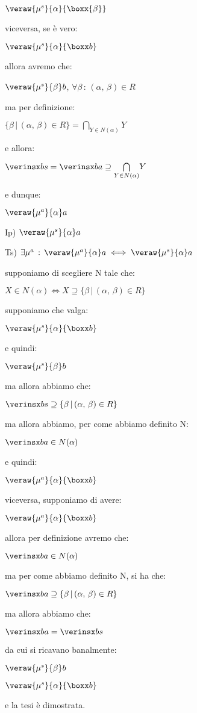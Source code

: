 $\veraw{\mu^{s}}{\alpha}{\boxx{\beta}}$

viceversa, se è vero:

$\veraw{\mu^{s}}{\alpha}{\boxx b}$

allora avremo che:

$\veraw{\mu^{s}}{\beta}b$, $\forall\beta\,:\,(\alpha,\,\beta)\in R$

ma per definizione:

$\{\beta\,|\,(\alpha,\,\beta)\in R\}=\underset{Y\in N(\alpha)}{\bigcap}Y$

e allora:

$\verinsx bs=\verinsx ba\supseteq\underset{Y\in N(\alpha)}{\bigcap}Y$

e dunque:

$\veraw{\mu^{a}}{\alpha}a$

Ip) $\veraw{\mu^{s}}{\alpha}a$

Ts) $\exists\mu^{a}\,:\,\veraw{\mu^{a}}{\alpha}a\iff\veraw{\mu^{s}}{\alpha}a$

supponiamo di scegliere N tale che:

$X\in N(\alpha)\iff X\supseteq\{\beta\,|\,(\alpha,\,\beta)\in R\}$

supponiamo che valga:

$\veraw{\mu^{s}}{\alpha}{\boxx b}$

e quindi:

$\veraw{\mu^{s}}{\beta}b$

ma allora abbiamo che:

$\verinsx bs\supseteq\{\beta\,|\,(\alpha,\,\beta)\in R\}$

ma allora abbiamo, per come abbiamo definito N:

$\verinsx ba\in N(\alpha)$

e quindi:

$\veraw{\mu^{a}}{\alpha}{\boxx b}$

viceversa, supponiamo di avere:

$\veraw{\mu^{a}}{\alpha}{\boxx b}$

allora per definizione avremo che:

$\verinsx ba\in N(\alpha)$

ma per come abbiamo definito N, si ha che:

$\verinsx ba\supseteq\{\beta\,|\,(\alpha,\,\beta)\in R\}$

ma allora abbiamo che:

$\verinsx ba=\verinsx bs$

da cui si ricavano banalmente:

$\veraw{\mu^{s}}{\beta}b$

$\veraw{\mu^{s}}{\alpha}{\boxx b}$

e la tesi è dimostrata.
